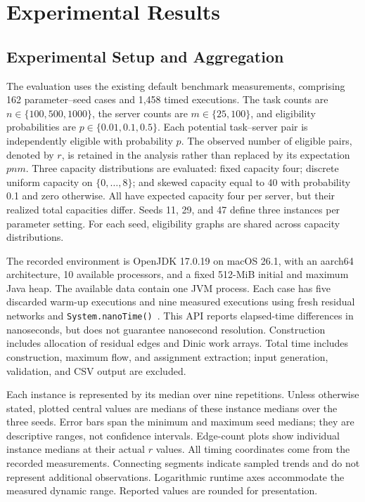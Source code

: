 \section{Experimental Results}
\label{sec:experiments}

\subsection{Experimental Setup and Aggregation}
The evaluation uses the existing default benchmark measurements, comprising
162 parameter--seed cases and 1,458 timed executions. The task counts are
$n\in\{100,500,1000\}$, the server counts are $m\in\{25,100\}$, and eligibility
probabilities are $p\in\{0.01,0.1,0.5\}$. Each potential task--server pair is
independently eligible with probability $p$. The observed number of eligible
pairs, denoted by $r$, is retained in the analysis rather than replaced by
its expectation $pnm$. Three capacity distributions are evaluated: fixed
capacity four; discrete uniform capacity on $\{0,\ldots,8\}$; and skewed
capacity equal to 40 with probability 0.1 and zero otherwise. All have
expected capacity four per server, but their realized total capacities differ.
Seeds 11, 29, and 47 define three instances per parameter setting. For each
seed, eligibility graphs are shared across capacity distributions.

The recorded environment is OpenJDK 17.0.19 on macOS 26.1, with an aarch64
architecture, 10 available processors, and a fixed 512-MiB initial and maximum
Java heap. The available data contain one JVM process. Each case has five
discarded warm-up executions and nine measured executions using fresh residual
networks and \texttt{System.nanoTime()}~\cite{oracleNanoTime}. This API reports
elapsed-time differences in nanoseconds, but does not guarantee nanosecond
resolution. Construction includes allocation of
residual edges and Dinic work arrays. Total time includes construction, maximum
flow, and assignment extraction; input generation, validation, and CSV output
are excluded.

Each instance is represented by its median over nine repetitions. Unless
otherwise stated, plotted central values are medians of these instance medians
over the three seeds. Error bars span the minimum and maximum seed medians;
they are descriptive ranges, not confidence intervals. Edge-count plots show
individual instance medians at their actual $r$ values. All timing coordinates
come from the recorded measurements. Connecting segments indicate sampled
trends and do not represent additional observations. Logarithmic runtime axes
accommodate the measured dynamic range. Reported values are rounded for
presentation.

